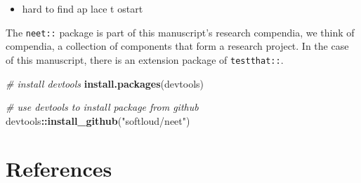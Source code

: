 \documentclass[
]{article}
\newenvironment{Shaded}{\begin{snugshade}}{\end{snugshade}}
\newcommand{\CommentTok}[1]{\textcolor[rgb]{0.56,0.35,0.01}{\textit{#1}}}
\newcommand{\KeywordTok}[1]{\textcolor[rgb]{0.13,0.29,0.53}{\textbf{#1}}}
\newcommand{\NormalTok}[1]{#1}
\newcommand{\OperatorTok}[1]{\textcolor[rgb]{0.81,0.36,0.00}{\textbf{#1}}}
\newcommand{\StringTok}[1]{\textcolor[rgb]{0.31,0.60,0.02}{#1}}
\providecommand{\tightlist}{%
  \setlength{\itemsep}{0pt}\setlength{\parskip}{0pt}}
\begin{document}
\begin{itemize}
\tightlist
\item
  hard to find ap lace t ostart
\end{itemize}

The \texttt{neet::} package is part of this manuscript's research compendia, we think of compendia, a collection of components that form a research project. In the case of this manuscript, there is an extension package of \texttt{testthat::}.

\begin{Shaded}
\begin{Highlighting}[]
\CommentTok{\# install devtools}
\KeywordTok{install.packages}\NormalTok{(devtools) }

\CommentTok{\# use devtools to install package from github}
\NormalTok{devtools}\OperatorTok{::}\KeywordTok{install\_github}\NormalTok{(}\StringTok{"softloud/neet"}\NormalTok{)}
\end{Highlighting}
\end{Shaded}

\hypertarget{references}{%
\section*{References}\label{references}}
\end{document}
